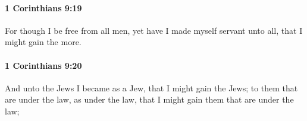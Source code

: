 		\paragraph{1 Corinthians 9:19} %
			\label{1CORINTHIANS-9-19}

			For though I be free from all men, yet have I made myself servant unto all, that I might gain the more.

			\begin{framed}
			\scriptsize
				\begin{compactdesc}
					\item[SBLG] 
				\end{compactdesc}
			\end{framed}

		\paragraph{1 Corinthians 9:20} %
			\label{1CORINTHIANS-9-20}

			And unto the Jews I became as a Jew, that I might gain the Jews; to them that are under the law, as under the law, that I might gain them that are under the law;

